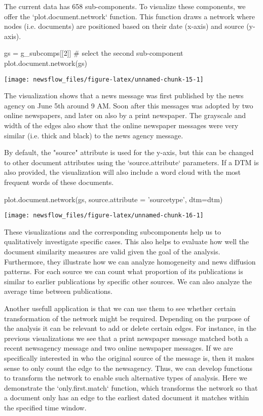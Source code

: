 The current data has 658 sub-components. 
To visualize these components, we offer the `plot.document.network` function.
This function draws a network where nodes (i.e. documents) are positioned based on their date (x-axis) and source (y-axis).

\begin{Schunk}
\begin{Sinput}
gs = g_subcomps[[2]] # select the second sub-component
plot.document.network(gs)
\end{Sinput}

\texttt{[image: newsflow\_files/figure-latex/unnamed-chunk-15-1]} \end{Schunk}

The visualization shows that a news message was first published by the news agency on June 5th around 9 AM. 
Soon after this messages was adopted by two online newspapers, and later on also by a print newspaper.
The grayscale and width of the edges also show that the online newspaper messages were very similar (i.e. thick and black) to the news agency message.

By default, the "source" attribute is used for the y-axis, but this can be changed to other document attributes using the `source.attribute` parameters.
If a DTM is also provided, the visualization will also include a word cloud with the most frequent words of these documents.

\begin{Schunk}
\begin{Sinput}
plot.document.network(gs, source.attribute = 'sourcetype', dtm=dtm)
\end{Sinput}

\texttt{[image: newsflow\_files/figure-latex/unnamed-chunk-16-1]} \end{Schunk}

These visualizations and the corresponding subcomponents help us to qualitatively investigate specific cases. 
This also helps to evaluate how well the document similarity measures are valid given the goal of the analysis.
Furthermore, they illustrate how we can analyze homogeneity and news diffusion patterns.
For each source we can count what proportion of its publications is similar to earlier publications by specific other sources.
We can also analyze the average time between publications.

Another usefull application is that we can use them to see whether certain transformation of the network might be required.
Depending on the purpose of the analysis it can be relevant to add or delete certain edges.
For instance, in the previous visualizations we see that a print newspaper message matched both a recent newsagency message and two online newspaper messages.
If we are specifically interested in who the original source of the message is, then it makes sense to only count the edge to the newsagency.
Thus, we can develop functions to transform the network to enable such alternative types of analysis.
Here we demonstrate the `only.first.match` function, which transforms the network so that a document only has an edge to the earliest dated document it matches within the specified time window.

